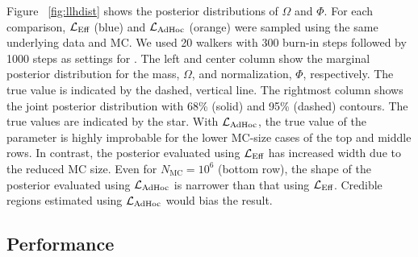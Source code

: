 Figure ~\ref{fig:llhdist} shows the posterior distributions of $\Omega$ and $\Phi$. For each comparison, $\mathcal{L}_\textmd{Eff}$ (blue) and $\mathcal{L}_{\textmd{AdHoc}}$ (orange) were sampled using the same underlying data and MC. We used 20 walkers with 300 burn-in steps followed by 1000 steps as settings for \emcee. The left and center column show the marginal posterior distribution for the mass, $\Omega$, and normalization, $\Phi$, respectively. The true value is indicated by the dashed, vertical line. The rightmost column shows the joint posterior distribution with 68\% (solid) and 95\% (dashed) contours. The true values are indicated by the star. With $\mathcal{L}_{\textmd{AdHoc}}$, the true value of the parameter is highly improbable for the lower MC-size cases of the top and middle rows. In contrast, the posterior evaluated using $\mathcal{L}_\textmd{Eff}$ has increased width due to the reduced MC size. Even for $N_\mathrm{MC}=10^6$ (bottom row), the shape of the posterior evaluated using $\mathcal{L}_{\textmd{AdHoc}}$ is narrower than that using $\mathcal{L}_\textmd{Eff}$. Credible regions estimated using $\mathcal{L}_{\textmd{AdHoc}}$ would bias the result.

\subsection{Performance\label{sec:performance}}

